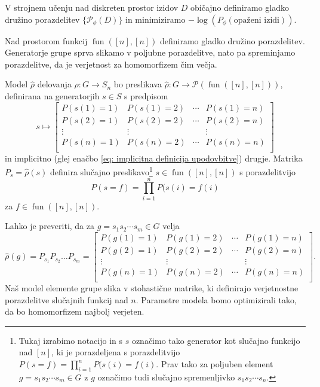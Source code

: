 \documentclass[mat2, tisk]{fmfdelo}
\newcommand{\fun}{\operatorname{fun}}
\newcommand{\funnn}[1]{\fun([#1], [#1])}
\begin{document}
 V strojnem učenju nad diskreten prostor izidov $D$ običajno definiramo gladko družino porazdelitev $\{\mathcal{P}_\phi(D)\}$ in minimiziramo  $-\log(P_\phi (\text{opaženi izidi}))$. 
 
 Nad prostorom funkcij $\funnn{n}$ definiramo gladko družino porazdelitev. Generatorje grupe sprva slikamo v poljubne porazdelitve, nato pa spreminjamo porazdelitve, da je verjetnost za homomorfizem čim večja.

 Model $\hat \rho$ delovanja $\rho \colon G \to S_n$ bo preslikava $\hat \rho \colon G \to \mathcal{P}(\funnn{n})$, definirana na generatorjih $s \in S$ s predpisom
 \begin{equation}
     \label{eq: model za delovanja}
     s \mapsto \begin{bmatrix}
        P(s(1) = 1) & P(s(1) = 2) & \dotsm & P(s(1) = n) \\
        P(s(2) = 1) & P(s(2) = 2) & \dotsm & P(s(2) = n) \\
        \vdots & \vdots & & \vdots \\
        P(s(n) = 1) & P(s(n) = 2) & \dotsm & P(s(n) = n) \\
    \end{bmatrix}
 \end{equation}
 in implicitno (glej enačbo  \eqref{eq: implicitna definicija upodovbitve}) drugje. Matrika $P_s = \hat\rho(s)$ definira slučajno preslikavo\footnote{Tukaj izrabimo notacijo in s $s$ označimo tako generator  kot slučajno funkcijo nad $[n]$, ki je porazdeljena s porazdelitvijo $P(s = f) = \prod _{i=1}^n P(s(i) = f(i)$. Prav tako za poljuben element $g=s_1s_2\dotsm s_m \in G$ z $g$ označimo tudi slučajno spremenljivko $s_1 s_2 \dotsm s_n$.}
 $s \in \funnn{n}$ s porazdelitvijo 
 $$P(s = f) = \prod _{i=1}^n P(s(i) = f(i)$$ 
 za $f \in \funnn{n}$.

Lahko je preveriti, da za  $g = s_1 s_2 \dotsm s_m\in G$ velja $$
\hat \rho (g) = P_{s_1} P_{s_2} \dotsc P_{s_m} = \begin{bmatrix}
            P(g(1) = 1) & P(g(1) = 2) & \dotsm & P(g(1) = n) \\
        P(g(2) = 1) & P(g(2) = 2) & \dotsm & P(g(2) = n) \\
        \vdots & \vdots & & \vdots \\
        P(g(n) = 1) & P(g(n) = 2) & \dotsm & P(g(n) = n) \\
\end{bmatrix}.
$$ 
Naš model elemente grupe slika v stohastične matrike, ki definirajo verjetnostne porazdelitve slučajnih funkcij nad $n$. Parametre modela bomo optimizirali tako, da bo homomorfizem najbolj verjeten.
\end{document}
